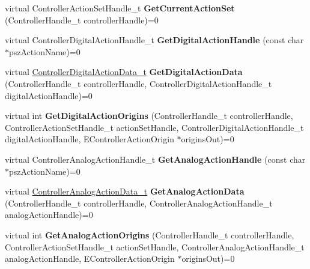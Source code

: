 \begin{DoxyCompactItemize}
virtual Controller\+Action\+Set\+Handle\+\_\+t {\bfseries Get\+Current\+Action\+Set} (Controller\+Handle\+\_\+t controller\+Handle)=0
\item 
\mbox{\label{class_i_steam_controller_afd95482937befad6b990f4057ba904cf}} 
virtual Controller\+Digital\+Action\+Handle\+\_\+t {\bfseries Get\+Digital\+Action\+Handle} (const char $\ast$psz\+Action\+Name)=0
\item 
\mbox{\label{class_i_steam_controller_ae5453dfb7bebddb25a3b0944177d2771}} 
virtual \hyperlink{struct_controller_digital_action_data__t}{Controller\+Digital\+Action\+Data\+\_\+t} {\bfseries Get\+Digital\+Action\+Data} (Controller\+Handle\+\_\+t controller\+Handle, Controller\+Digital\+Action\+Handle\+\_\+t digital\+Action\+Handle)=0
\item 
\mbox{\label{class_i_steam_controller_aad5112eb0d9dfa7e8f1a80019d9051e7}} 
virtual int {\bfseries Get\+Digital\+Action\+Origins} (Controller\+Handle\+\_\+t controller\+Handle, Controller\+Action\+Set\+Handle\+\_\+t action\+Set\+Handle, Controller\+Digital\+Action\+Handle\+\_\+t digital\+Action\+Handle, E\+Controller\+Action\+Origin $\ast$origins\+Out)=0
\item 
\mbox{\label{class_i_steam_controller_a134a7b57651b9139793a531c33d59c92}} 
virtual Controller\+Analog\+Action\+Handle\+\_\+t {\bfseries Get\+Analog\+Action\+Handle} (const char $\ast$psz\+Action\+Name)=0
\item 
\mbox{\label{class_i_steam_controller_a3504851a3279626207ac5785593e0595}} 
virtual \hyperlink{struct_controller_analog_action_data__t}{Controller\+Analog\+Action\+Data\+\_\+t} {\bfseries Get\+Analog\+Action\+Data} (Controller\+Handle\+\_\+t controller\+Handle, Controller\+Analog\+Action\+Handle\+\_\+t analog\+Action\+Handle)=0
\item 
\mbox{\label{class_i_steam_controller_af0c0efd7c0afeffca32f7bd6feada903}} 
virtual int {\bfseries Get\+Analog\+Action\+Origins} (Controller\+Handle\+\_\+t controller\+Handle, Controller\+Action\+Set\+Handle\+\_\+t action\+Set\+Handle, Controller\+Analog\+Action\+Handle\+\_\+t analog\+Action\+Handle, E\+Controller\+Action\+Origin $\ast$origins\+Out)=0

\end{DoxyCompactItemize}
